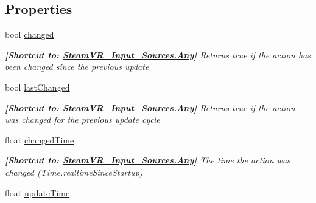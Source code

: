 \subsection*{Properties}
\begin{DoxyCompactItemize}
\item 
bool \mbox{\hyperlink{class_valve_1_1_v_r_1_1_steam_v_r___action___in_a129bfbee3aa107bc4fcb46716a240d88}{changed}}
\begin{DoxyCompactList}\small\item\em {\bfseries{\mbox{[}Shortcut to\+: \mbox{\hyperlink{namespace_valve_1_1_v_r_a82e5bf501cc3aa155444ee3f0662853faed36a1ef76a59ee3f15180e0441188ad}{Steam\+V\+R\+\_\+\+Input\+\_\+\+Sources.\+Any}}\mbox{]}}} Returns true if the action has been changed since the previous update \end{DoxyCompactList}\item 
bool \mbox{\hyperlink{class_valve_1_1_v_r_1_1_steam_v_r___action___in_a61423de9edc8a8301e81f2522d635507}{last\+Changed}}
\begin{DoxyCompactList}\small\item\em {\bfseries{\mbox{[}Shortcut to\+: \mbox{\hyperlink{namespace_valve_1_1_v_r_a82e5bf501cc3aa155444ee3f0662853faed36a1ef76a59ee3f15180e0441188ad}{Steam\+V\+R\+\_\+\+Input\+\_\+\+Sources.\+Any}}\mbox{]}}} Returns true if the action was changed for the previous update cycle \end{DoxyCompactList}\item 
float \mbox{\hyperlink{class_valve_1_1_v_r_1_1_steam_v_r___action___in_afccb197dbb5d721e390e60cce83957f4}{changed\+Time}}
\begin{DoxyCompactList}\small\item\em {\bfseries{\mbox{[}Shortcut to\+: \mbox{\hyperlink{namespace_valve_1_1_v_r_a82e5bf501cc3aa155444ee3f0662853faed36a1ef76a59ee3f15180e0441188ad}{Steam\+V\+R\+\_\+\+Input\+\_\+\+Sources.\+Any}}\mbox{]}}} The time the action was changed (Time.\+realtime\+Since\+Startup) \end{DoxyCompactList}\item 
float \mbox{\hyperlink{class_valve_1_1_v_r_1_1_steam_v_r___action___in_a2b6e25e75c6ebc79eda8b335abedb031}{update\+Time}}

\end{DoxyCompactItemize}
